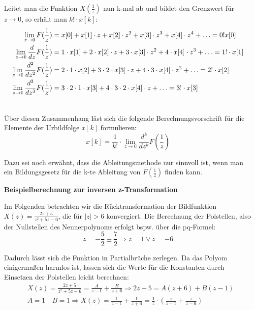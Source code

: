 Leitet man die Funktion $X(\frac{1}{z})$ nun k-mal ab und bildet den Grenzwert für $z \rightarrow 0$, so erhält man $k! \cdot x[k]$:
\begin{align}
    \notag
    \lim_{z \to 0} F(\frac{1}{z}) &= x[0] + x[1] \cdot z + x[2] \cdot z^2 + x[3] \cdot z^3 + x[4] \cdot z^4 + \ldots = 0! x[0] \\
    \notag
    \lim_{z \to 0} \frac{d}{dz} F(\frac{1}{z}) &= 1 \cdot x[1] + 2 \cdot x[2] \cdot z + 3 \cdot x[3] \cdot z^2 + 4 \cdot x[4] \cdot z^3 + \ldots = 1! \cdot x[1] \\
    \notag
    \lim_{z \to 0} \frac{d^2}{dz^2} F(\frac{1}{z}) &= 2 \cdot 1 \cdot x[2] + 3 \cdot 2 \cdot x[3] \cdot z + 4 \cdot 3 \cdot x[4] \cdot z^2 + \ldots = 2! \cdot x[2]
     \\ \notag
    \lim_{z \to 0} \frac{d^3}{dz^3} F(\frac{1}{z}) &= 3 \cdot 2 \cdot 1 \cdot x[3] + 4 \cdot 3 \cdot 2 \cdot x[4] \cdot z + \ldots = 3! \cdot x[3] \\
    \notag
\end{align}

Über diesen Zusammenhang läst sich die folgende Berechnungsvorschrift für die Elemente der Urbildfolge $x[k]$ formulieren:
\begin{equation}
    \boxed{
    x[k] = \frac{1}{k!} \cdot \lim_{z \to 0} \frac{d^k}{dz^k} F(\frac{1}{z})
    }
\end{equation}  

Dazu sei noch erwähnt, dass die Ableitungsmethode nur sinnvoll ist, wenn man ein Bildungsgesetz für die k-te Ableitung von $F(\frac{1}{z})$ finden kann.

\addvspace{1cm}

\textbf{Beispielberechnung zur inversen z-Transformation}

Im Folgenden betrachten wir die Rücktransformation der Bildfunktion $X(z) = \frac{2z+5}{z^2+5z-6}$, die für $|z| > 6$ konvergiert.
Die Berechnung der Polstellen, also der Nullstellen des Nennerpolynoms erfolgt bspw. über die pq-Formel:
\begin{equation}
    z = -\frac{5}{2} \pm \frac{7}{2} \Rightarrow  z = 1 \vee  z = -6
\end{equation}

Dadurch lässt sich die Funktion in Partialbrüche zerlegen. Da das Polyom einigermaßen harmlos ist, lassen sich die Werte für die Konstanten durch Einsetzen der Polstellen leicht berechnen:
\begin{equation}
\begin{aligned}
    &X(z) = \frac{2z+5}{z^2+5z-6} = \frac{A}{z-1} + \frac{B}{z+6} \Rightarrow 2z+5 = A(z+6) + B(z-1) \\
    &A = 1 \quad B = 1 \Rightarrow X(z) = \frac{1}{z-1} + \frac{1}{z+6} = \frac{1}{z} \cdot \left(\frac{z}{z-1} + \frac{z}{z-6}\right)
\end{aligned}
\end{equation}

